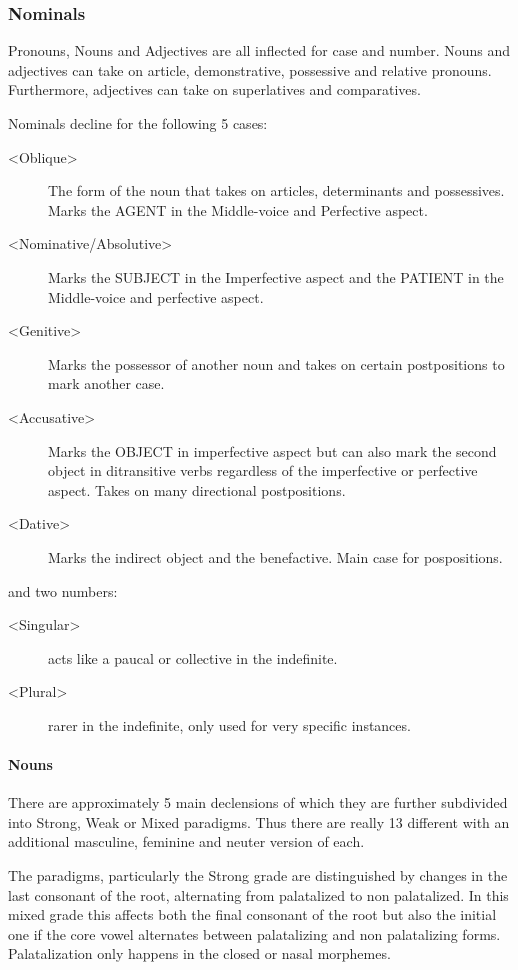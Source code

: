 \documentclass[11pt,a4paper]{article}
\begin{document}
\subsubsection{Nominals}
\label{sec:org11f1b16}
Pronouns, Nouns and Adjectives are all inflected for case and number.
Nouns and adjectives can take on article, demonstrative, possessive and relative pronouns.
Furthermore, adjectives can take on superlatives and comparatives.

Nominals decline for the following 5 cases:

\begin{description}
\item[{<Oblique>}] The form of the noun that takes on articles, determinants and possessives. Marks the AGENT in the Middle-voice and Perfective aspect.
\item[{<Nominative/Absolutive>}] Marks the SUBJECT in the Imperfective aspect and the PATIENT in the Middle-voice and perfective aspect.
\item[{<Genitive>}] Marks the possessor of another noun and takes on certain postpositions to mark another case.
\item[{<Accusative>}] Marks the OBJECT in imperfective aspect but can also mark the second object in ditransitive verbs regardless of the imperfective or perfective aspect. Takes on many directional postpositions.
\item[{<Dative>}] Marks the indirect object and the benefactive. Main case for pospositions.
\end{description}

and two numbers:

\begin{description}
\item[{<Singular>}] acts like a paucal or collective in the indefinite.
\item[{<Plural>}] rarer in the indefinite, only used for very specific instances.
\end{description}

\paragraph{Nouns}
\label{sec:orgb9aeb15}
There are approximately 5 main declensions of which they are further subdivided
into Strong, Weak or Mixed paradigms.  Thus there are really 13 different with
an additional masculine, feminine and neuter version of each.

The paradigms, particularly the Strong grade are distinguished by changes in the
last consonant of the root, alternating from palatalized to non palatalized.  In
this mixed grade this affects both the final consonant of the root but also the
initial one if the core vowel alternates between palatalizing and non
palatalizing forms.  Palatalization only happens in the closed or nasal
morphemes.
\end{document}
